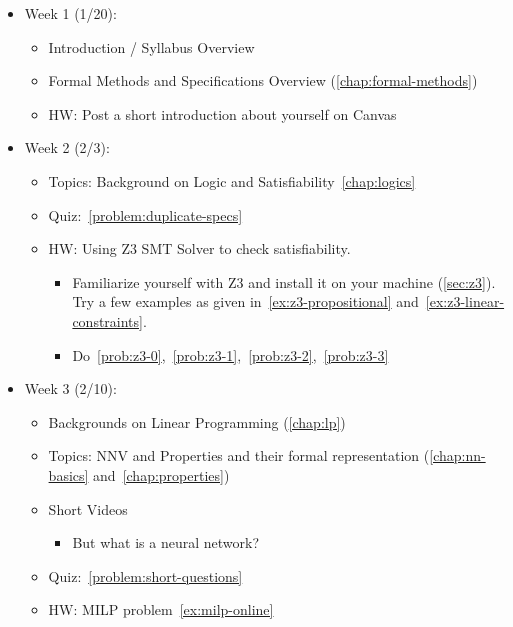 \documentclass[oneside,11pt,dvipsnames]{book}
\numberwithin{equation}{section}
\theoremstyle{definition}
\theoremstyle{remark}
\begin{document}
\begin{itemize}
    \item Week 1 (1/20): 
    \begin{itemize}
        \item Introduction / Syllabus Overview
        \item Formal Methods and Specifications Overview (\autoref{chap:formal-methods})
        \item HW: Post a short introduction about yourself on Canvas
    \end{itemize}
    
    \item Week 2 (2/3):
    \begin{itemize}
    \item Topics: Background on Logic and Satisfiability~\autoref{chap:logics}
    \item Quiz:~\autoref{problem:duplicate-specs}
    \item HW: Using Z3 SMT Solver to check satisfiability.
    \begin{itemize}
        \item Familiarize yourself with Z3 and install it on your machine (\autoref{sec:z3}). Try a few examples as given in~\autoref{ex:z3-propositional} and~\autoref{ex:z3-linear-constraints}.
      \item Do~\autoref{prob:z3-0},~\autoref{prob:z3-1},~\autoref{prob:z3-2},~\autoref{prob:z3-3}
    \end{itemize}
      
            
    \end{itemize}

    \item Week 3 (2/10):
    \begin{itemize}
        \item Backgrounds on Linear Programming (\autoref{chap:lp})
        \item Topics: NNV and Properties and their formal representation (\autoref{chap:nn-basics} and~\autoref{chap:properties})
        \item Short Videos
        \begin{itemize}
            \item But what is a neural network?~\cite{3blue1brown2017neuralnetworks}
        \end{itemize}
        \item Quiz:~\autoref{problem:short-questions}             
        \item HW: MILP problem~\autoref{ex:milp-online}
            

\end{itemize}
\end{itemize}
\end{document}
